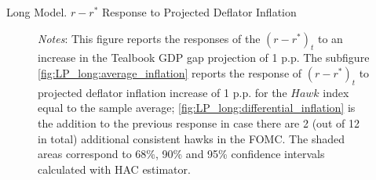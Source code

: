 \documentclass[10pt,aspectratio=169]{beamer}
\begin{document}
\begin{frame}{Long Model. $r-r^*$ Response to Projected Deflator Inflation}
\begin{figure}[!htbp]
\begin{minipage}{\textwidth}
\begin{subfigure}[b]{0.48\textwidth}
        \end{subfigure}\vspace{-2ex}
            {\begin{flushleft}\tiny\textit{Notes}: This figure reports the responses of the $(r-r^*)_t$ to an increase in the Tealbook GDP gap projection of 1 p.p. The subfigure \ref{fig:LP_long:average_inflation} reports the response of $(r-r^*)_t$ to projected deflator inflation increase of 1 p.p. for the $\mathit{Hawk}$ index equal to the sample average; \ref{fig:LP_long:differential_inflation} is the addition to the previous response in case there are 2 (out of 12 in total) additional consistent hawks in the FOMC. The shaded areas correspond to 68\%, 90\% and 95\% confidence intervals calculated with \cite{Andrews1991} HAC estimator. \end{flushleft}}
        \end{minipage}
    \end{figure}
    
\end{frame}
\end{document}
